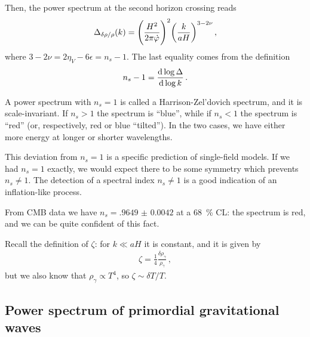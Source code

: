 \documentclass[main.tex]{subfiles}
\begin{document}

Then, the power spectrum at the second horizon crossing reads
%
\begin{align}\label{eq:density-perturbation-power-spectrum}
\Delta_{ \delta \rho / \rho  } (k) 
= \qty(\frac{H^2}{2 \pi \dot{\varphi}})^2 \qty(\frac{k}{aH})^{3-2\nu }
\,,
\end{align}
%
where \(3 - 2 \nu = 2 \eta _V - 6 \epsilon = n_s -1\). 
The last equality comes from the definition 
%
\begin{align}
n_s - 1 = \dv{\log \Delta }{\log k}
\,.
\end{align}
%

A power spectrum with \(n_s = 1\) is called a Harrison-Zel'dovich spectrum, and it is scale-invariant.
If \(n_s > 1\) the spectrum is ``blue'', while if \(n_s < 1\) the spectrum is ``red'' (or, respectively, red or blue ``tilted''). 
In the two cases, we have either more energy at longer or shorter wavelengths.

This deviation from \(n_s = 1\) is a specific prediction of single-field models.
If we had \(n_s = 1\) exactly, we would expect there to be some symmetry which prevents \(n_s \neq 1\). 
The detection of a spectral index \(n_s \neq 1\) is a good indication of an inflation-like process. 

From CMB data \cite[eq.\ 21]{planckcollaborationPlanck2018Results2019} we have \(n_s = \num{.9649(42)}\) at a \SI{68}{\percent} CL: the spectrum is red, and we can be quite confident of this fact.

Recall the definition of \(\zeta \): for \(k \ll aH\) it is constant, and it is given by 
%
\begin{align}
\zeta = \frac{1}{4} \frac{ \delta \rho _\gamma }{\rho _\gamma }
\,,
\end{align}
%
but we also know that \(\rho _\gamma \propto T^{4}\), so \(\zeta \sim \delta T / T\). 

\subsection{Power spectrum of primordial gravitational waves}
\end{document}
